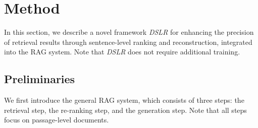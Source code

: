 \section{Method}



In this section, we describe a novel framework \textit{DSLR} for enhancing the precision of retrieval results through sentence-level ranking and reconstruction, integrated into the RAG system. Note that \textit{DSLR} does not require additional training.



\subsection{Preliminaries}

We first introduce the general RAG system, which consists of three steps: the retrieval step, the re-ranking step, and the generation step.
Note that all steps focus on passage-level documents.


